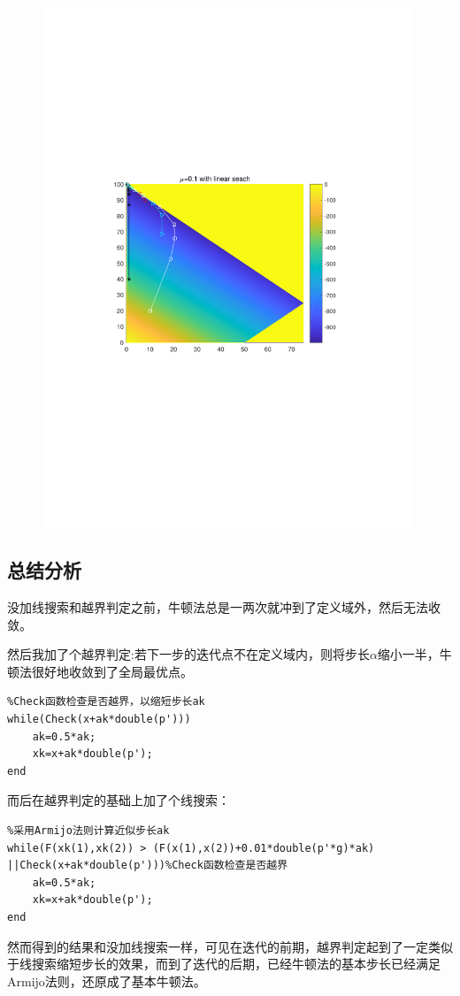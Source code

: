 \begin{figure}[H]
\centering
\includegraphics[width=11cm]{fig/5_2.pdf}
\end{figure}

\subsection{总结分析}
没加线搜索和越界判定之前，牛顿法总是一两次就冲到了定义域外，然后无法收敛。

然后我加了个越界判定:若下一步的迭代点不在定义域内，则将步长$\alpha$缩小一半，牛顿法很好地收敛到了全局最优点。

\begin{lstlisting}
%Check函数检查是否越界，以缩短步长ak
while(Check(x+ak*double(p')))
	ak=0.5*ak;
	xk=x+ak*double(p');
end
\end{lstlisting}

而后在越界判定的基础上加了个线搜索：

\begin{lstlisting}
%采用Armijo法则计算近似步长ak
while(F(xk(1),xk(2)) > (F(x(1),x(2))+0.01*double(p'*g)*ak)
||Check(x+ak*double(p')))%Check函数检查是否越界
	ak=0.5*ak;
	xk=x+ak*double(p');
end
\end{lstlisting}

然而得到的结果和没加线搜索一样，可见在迭代的前期，越界判定起到了一定类似于线搜索缩短步长的效果，而到了迭代的后期，已经牛顿法的基本步长已经满足Armijo法则，还原成了基本牛顿法。
